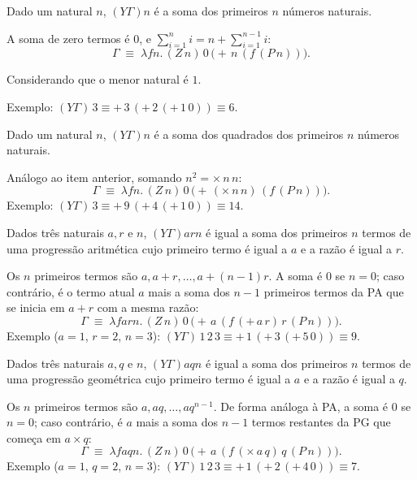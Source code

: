 {{\begin{Qlist}
        \item[(g)] Dado um natural $n$, $(Y\Gamma)n$ é a soma dos primeiros $n$ números naturais.

        \begin{solution}
        A soma de zero termos é $0$, e $\sum_{i=1}^{n} i = n + \sum_{i=1}^{n-1} i$:
        \[
            \Gamma \;\equiv\; \lambda fn.\,(Z\,n)\,0\,\bigl(+\,n\,(f\,(P\,n))\bigr).
        \]

		Considerando que o menor natural é $1$.

        Exemplo: $(Y\Gamma)\,3 \equiv +\,3\,(+\,2\,(+\,1\,0)) \equiv 6$.
        \end{solution}

        \pagebreak
        \item[(h)] Dado um natural $n$, $(Y\Gamma)n$ é a soma dos quadrados dos primeiros $n$ números naturais.

        \begin{solution}
        Análogo ao item anterior, somando $n^2 = \times\,n\,n$:
        \[
            \Gamma \;\equiv\; \lambda fn.\,(Z\,n)\,0\,\bigl(+\,(\times\,n\,n)\,(f\,(P\,n))\bigr).
        \]
        Exemplo: $(Y\Gamma)\,3 \equiv +\,9\,(+\,4\,(+\,1\,0)) \equiv 14$.
        \end{solution}

        \item[(i)] Dados três naturais $a, r$ e $n$, $(Y\Gamma)arn$ é igual a soma dos primeiros $n$ termos
            de uma progressão aritmética cujo primeiro termo é igual a $a$ e a razão é igual a $r$.

        \begin{solution}
        Os $n$ primeiros termos são $a, a+r, \ldots, a+(n-1)r$. A soma é $0$ se $n=0$; caso contrário, é o termo atual $a$ mais a soma dos $n-1$ primeiros termos da PA que se inicia em $a+r$ com a mesma razão:
        \[
            \Gamma \;\equiv\; \lambda farn.\,(Z\,n)\,0\,\bigl(+\,a\,(f\,(+\,a\,r)\,r\,(P\,n))\bigr).
        \]
        Exemplo ($a=1$, $r=2$, $n=3$): $(Y\Gamma)\,1\,2\,3 \equiv +\,1\,(+\,3\,(+\,5\,0)) \equiv 9$.
        \end{solution}

        \item[(j)] Dados três naturais $a, q$ e $n$, $(Y\Gamma)aqn$ é igual a soma dos primeiros $n$ termos
            de uma progressão geométrica cujo primeiro termo é igual a $a$ e a razão é igual a $q$.

        \begin{solution}
        Os $n$ primeiros termos são $a, aq, \ldots, aq^{n-1}$. De forma análoga à PA, a soma é $0$ se $n=0$; caso contrário, é $a$ mais a soma dos $n-1$ termos restantes da PG que começa em $a\times q$:
        \[
            \Gamma \;\equiv\; \lambda faqn.\,(Z\,n)\,0\,\bigl(+\,a\,(f\,(\times\,a\,q)\,q\,(P\,n))\bigr).
        \]
        Exemplo ($a=1$, $q=2$, $n=3$): $(Y\Gamma)\,1\,2\,3 \equiv +\,1\,(+\,2\,(+\,4\,0)) \equiv 7$.
        \end{solution}
    \end{Qlist}
} }



